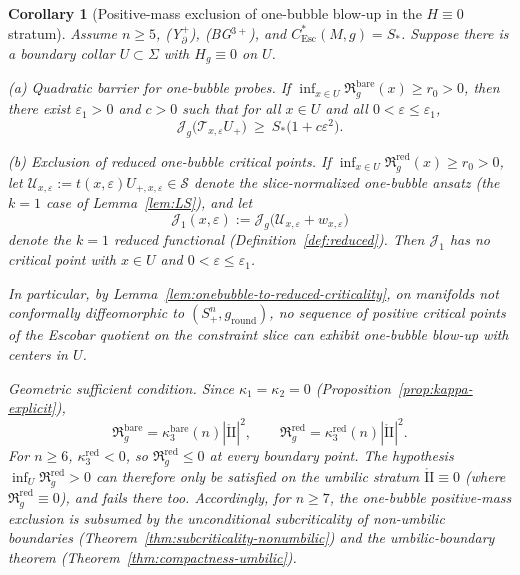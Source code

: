 \documentclass[11pt,reqno,a4paper]{amsart}
\numberwithin{equation}{section}
\theoremstyle{plain}
\newtheorem{corollary}[theorem]{Corollary}
\theoremstyle{remark}
\theoremstyle{plain}
\begin{document}
\begin{corollary}[Positive-mass exclusion of one-bubble blow-up in the $H\equiv0$ stratum]\label{cor:willmore-closure}
Assume $n\ge5$, \textup{(Y$^+_{\partial}$)}, \textup{(BG$^{3+}$)}, and $C^\ast_{\mathrm{Esc}}(M,g)=S_\ast$.
Suppose there is a boundary collar $U\subset\Sigma$ with $H_g\equiv0$ on $U$.

\smallskip
\noindent\textup{(a) Quadratic barrier for one-bubble probes.}
If $\inf_{x\in U}\mathfrak R_g^{\mathrm{bare}}(x)\ge r_0>0$,
then there exist $\varepsilon_1>0$ and $c>0$ such that
for all $x\in U$ and all $0<\varepsilon\le\varepsilon_1$,
\[
\mathcal J_g\big(\mathcal T_{x,\varepsilon}U_+\big)\ \ge\ S_\ast\Big(1+c\varepsilon^2\Big).
\]

\smallskip
\noindent\textup{(b) Exclusion of reduced one-bubble critical points.}
If $\inf_{x\in U}\mathfrak R_g^{\mathrm{red}}(x)\ge r_0>0$,
let $\mathcal U_{x,\varepsilon}:=t(x,\varepsilon)U_{+,x,\varepsilon}\in\mathcal S$ denote the slice-normalized
one-bubble ansatz (the $k=1$ case of Lemma~\ref{lem:LS}), and let
\[
\mathcal J_1(x,\varepsilon):=\mathcal J_g\big(\mathcal U_{x,\varepsilon}+w_{x,\varepsilon}\big)
\]
denote the $k=1$ reduced functional (Definition~\ref{def:reduced}).
 Then $\mathcal J_1$ has no critical point
with $x\in U$ and $0<\varepsilon\le\varepsilon_1$.

In particular, by Lemma~\ref{lem:onebubble-to-reduced-criticality},
on manifolds not conformally diffeomorphic to $(S^n_+,g_{\mathrm{round}})$,
no sequence of
\emph{positive critical points} of the Escobar quotient on the constraint slice
can exhibit \emph{one-bubble}
blow-up with centers in $U$.


\smallskip
\noindent\emph{Geometric sufficient condition.}
Since $\kappa_1=\kappa_2=0$ (Proposition~\ref{prop:kappa-explicit}),
\[
\mathfrak R_g^{\mathrm{bare}}=\kappa_3^{\mathrm{bare}}(n)|\mathring{\mathrm{II}}|^2,
\qquad
\mathfrak R_g^{\mathrm{red}}=\kappa_3^{\mathrm{red}}(n)|\mathring{\mathrm{II}}|^2.
\]
For $n\ge6$, $\kappa_3^{\mathrm{red}}<0$, so $\mathfrak R_g^{\mathrm{red}}\le0$
at every boundary point. The hypothesis $\inf_U\mathfrak R_g^{\mathrm{red}}>0$
can therefore only be satisfied on the \emph{umbilic} stratum $\mathring{\mathrm{II}}\equiv0$
(where $\mathfrak R_g^{\mathrm{red}}\equiv0$), and fails there too.
Accordingly, for $n\ge7$, the one-bubble positive-mass exclusion is subsumed by
the unconditional subcriticality of non-umbilic boundaries
(Theorem~\ref{thm:subcriticality-nonumbilic})
and the umbilic-boundary theorem (Theorem~\ref{thm:compactness-umbilic}).
\end{corollary}
\end{document}
